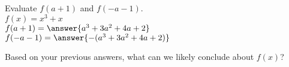 \documentclass{ximera}
\author{David Kish}
\begin{document}
\begin{exercise}
Evaluate $f(a+1)$ and $f(-a-1)$.\\
$f(x)= x^3+x$\\
$f(a+1)=\answer{a^3+3a^2+4a+2}$\\
$f(-a-1)=\answer{-(a^3+3a^2+4a+2)}$
\end{exercise}
\begin{exercise}
Based on your previous answers, what can we likely conclude about $f(x)$?
\begin{multipleChoice}
\end{multipleChoice}
\end{exercise}
\end{document}
